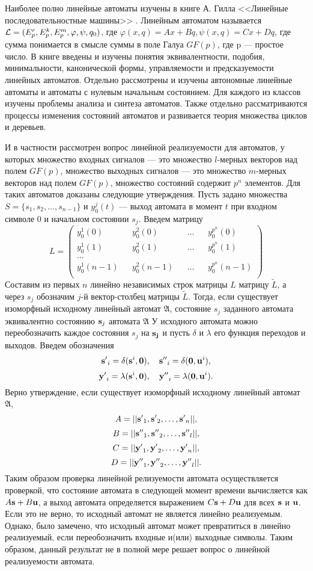 Наиболее полно линейные автоматы изучены в книге А. Гилла <<Линейные последовательностные машины>> \cite{gill}. Линейным автоматом называется ${\cal L}=(E_p^r, E_p^k, E_p^m,\varphi,\psi,q_0)$, где $\varphi(x,q)=Ax+Bq, \psi(x,q)=Cx+Dq$, где сумма понимается в смысле суммы в поле Галуа $GF(p)$, где p --- простое число.
В книге введены и изучены понятия эквивалентности, подобия, минимальности, канонической формы, управляемости и предсказуемости линейных автоматов. Отдельно рассмотрены и изучены автономные линейные автоматы и автоматы с нулевым начальным состоянием. Для каждого из классов изучены проблемы анализа и синтеза автоматов. Также отдельно рассматриваются процессы изменения состояний автоматов и развивается теория множества циклов и деревьев.

И в частности рассмотрен вопрос линейной реализуемости для автоматов, у которых множество входных сигналов --- это множество $l$-мерных векторов над полем $GF(p)$,  множество выходных сигналов --- это множество $m$-мерных векторов над полем $GF(p)$, множество состояний содержит $p^n$ элементов. Для таких автоматов доказаны следующие утверждения. Пусть задано множества $S=\{s_1,s_2,\ldots,s_{n-1}\}$ и $y_0^j(t)$ --- выход автомата в момент $t$ при входном символе $0$ и начальном состоянии $s_j$. Введем матрицу
$$
L=\begin{pmatrix}
y_0^1(0) && y_0^2(0) && \ldots &&  y_0^{p^n}(0) \\
y_0^1(1) && y_0^2(1) && \ldots &&  y_0^{p^n}(1) \\
\ldots \\
y_0^1(n-1) && y_0^2(n-1) && \ldots &&  y_0^{p^n}(n-1) \\
\end{pmatrix}
$$
Составим из первых $n$ линейно независимых строк матрицы $L$ матрицу $\widetilde{L}$, а через $s_j$ обозначим $j$-й вектор-столбец матрицы $\widetilde{L}$. Тогда, если существует изоморфный исходному линейный автомат ${\mathfrak A}$, состояние $s_j$ заданного автомата эквивалентно состоянию ${\bf s}_j$ автомата ${\mathfrak A}$
У исходного автомата можно переобозначить каждое состояния $s_j$ на ${\bf s_j}$ и пусть $\delta$ и $\lambda$ его функция переходов и выходов.
Введем обозначения 
$$
{\bf s'}_i=\delta({\bf s}^i,{\bf 0}),\quad {\bf s''}_i=\delta({\bf 0},{\bf u}^i),
$$
$$
{\bf y'}_i=\lambda({\bf s}^i,{\bf 0}),\quad {\bf y''}_i=\lambda({\bf 0},{\bf u}^i).
$$
Верно утверждение, если существует изоморфный исходному линейный автомат ${\mathfrak A}$,
$$
A=||{\bf s'}_1,{\bf s'}_2,\ldots,{\bf s'}_n||,
$$
$$
B=||{\bf s''}_1,{\bf s''}_2,\ldots,{\bf s''}_l||,
$$
$$
C=||{\bf y'}_1,{\bf y'}_2,\ldots,{\bf y'}_n||,
$$
$$
D=||{\bf y''}_1,{\bf y''}_2,\ldots,{\bf y''}_l||.
$$
Таким образом проверка линейной релизуемости автомата осуществляется проверкой, что состояние автомата в следующей момент времени вычисляется как $A{\bf s}+B{\bf u}$, а выход автомата определяется выражением $C{\bf s}+D{\bf u}$ для всех ${\bf s}$ и ${\bf u}$. Если это не верно, то исходный автомат не является линейно реализуемым. Однако, было замечено, что исходный автомат может превратиться в линейно реализуемый, если переобозначить входные и(или) выходные символы.
Таким образом, данный результат не в полной мере решает вопрос о линейной реализуемости автомата.

